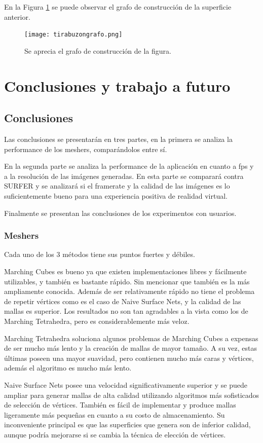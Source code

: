\documentclass[12pt]{article}
\begin{document}
En la Figura \ref{grafobz} se puede observar el grafo de construcción de la superficie anterior. 
\begin{figure}[h!]
\texttt{[image: tirabuzongrafo.png]}
\caption{Se aprecia el grafo de construcción de la figura.}
\label{grafobz}
\end{figure}
\clearpage
\section{Conclusiones y trabajo a futuro}
\subsection{Conclusiones}
\noindent Las conclusiones se presentarán en tres partes, en la primera se analiza la performance de los meshers, comparándolos entre sí. 

En la segunda parte se analiza la performance de la aplicación en cuanto a fps y a la resolución de las imágenes generadas. En esta parte se comparará contra SURFER y se analizará si el framerate y la calidad de las imágenes es lo suficientemente bueno para una experiencia positiva de realidad virtual.

Finalmente se presentan las conclusiones de los experimentos con usuarios.
\subsubsection{Meshers}
\noindent Cada uno de los 3 métodos tiene sus puntos fuertes y débiles. 

Marching Cubes es bueno ya que existen implementaciones libres y fácilmente utilizables, y también es bastante rápido. Sin mencionar que también es la más ampliamente conocida. Además de ser relativamente rápido no tiene el problema de repetir vértices como es el caso de Naive Surface Nets, y la calidad de las mallas es superior. Los resultados no son tan agradables a la vista como los de Marching Tetrahedra, pero es considerablemente más veloz. 

Marching Tetrahedra soluciona algunos problemas de Marching Cubes a expensas de ser mucho más lento y la creación de mallas de mayor tamaño. A su vez, estas últimas poseen una mayor suavidad, pero contienen mucho más caras y vértices, además  el algoritmo es mucho más lento.

Naive Surface Nets posee una velocidad significativamente superior y se puede ampliar para generar mallas de alta calidad utilizando algoritmos más sofisticados de selección de vértices. También es fácil de implementar y produce mallas ligeramente más pequeñas en cuanto a su costo de almacenamiento. Su inconveniente principal es que las superficies que genera son de inferior calidad, aunque podría mejorarse si se cambia la técnica de elección de vértices. 
\end{document}
